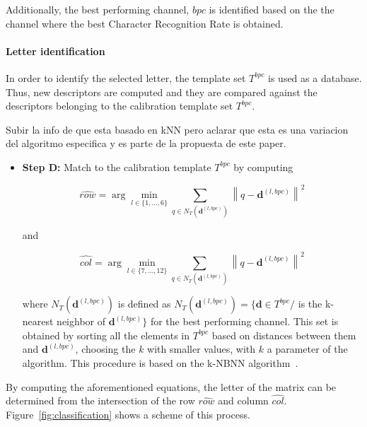 \documentclass[utf8]{frontiersSCNS} %
\begin{document}
Additionally, the best performing channel, $bpc$ is identified based on the the channel where the best Character Recognition Rate is obtained.

\paragraph{Letter identification}

In order to identify the selected letter, the template set $T^{bpc}$ is used as a database.  Thus, new descriptors are computed and they are compared against the descriptors belonging to the calibration template set $T^{bpc}$.

Subir la info de que esta basado en kNN pero aclarar que esta es una variacion del algoritmo especifica y es parte de la propuesta de este paper.


\begin{itemize}

\item \textbf{Step D:} Match to the calibration template $T^{bpc}$ by computing  

\begin{equation}
\hat{row} = \arg \min_{l \in \{1,\dots,6\}} \sum_{q \in N_T(\mathbf{d}^{(l,bpc)})}^{} {\left\lVert q -  \mathbf{d}^{(l,bpc)} \right\rVert}  ^{2}
\label{eq:multiclassificationrow}
\end{equation}

\noindent and

\begin{equation}
\hat{col} = \arg \min_{l \in \{7,\dots,12\}} \sum_{q \in N_T(\mathbf{d}^{(l,bpc)})}^{} {\left\lVert q -  \mathbf{d}^{(l,bpc)} \right\rVert} ^{2}
\label{eq:multiclassificationcol}
\end{equation}

\noindent where $N_T(\mathbf{d}^{(l,bpc)})$  is defined as $N_T(\mathbf{d}^{(l,bpc)}) = \{\mathbf{d} \in T^{bpc} / $  is the k-nearest neighbor of $ \mathbf{d}^{(l,bpc)} \}$ for the best performing channel.  This set is obtained by sorting all the elements in $T^{bpc}$ based on distances between them and $\mathbf{d}^{(l,bpc)}$, choosing the $k$ with smaller values, with $k$ a parameter of the algorithm.  This procedure is based on the k-NBNN  algorithm~\citep{Boiman2008}.

\end{itemize}
By computing the aforementioned equations, the letter of the matrix can be determined from the intersection of the row $ \hat{row} $ and column $ \hat{col} $. 
Figure~\ref{fig:classification} shows a scheme of this process. 
\end{document}

